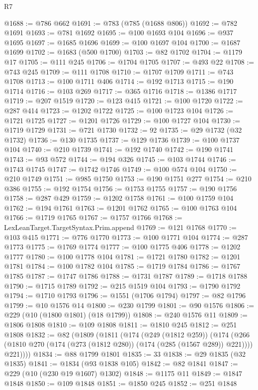 \begin{lexlean}{R7}
\begin{coremodule}
@1688 := @786 @662
@1691 := @783 (@785 (@1688 @806))
@1692 := @782 @1691
@1693 := @781 @1692
@1695 := @100 @1693 @104
@1696 := @937 @1695
@1697 := @1685 @1696
@1699 := @100 @1697 @104
@1700 := @1687 @1699
@1702 := @1683 (@500 @1700)
@1703 := @82 @1702
@1704 := @1179 @17
@1705 := @111 @245
@1706 := @1704 @1705
@1707 := @493 @22
@1708 := @743 @245
@1709 := @111 @1708
@1710 := @1707 @1709
@1711 := @743 @1708
@1713 := @100 @1711 @406
@1714 := @192 @1713
@1715 := @190 @1714
@1716 := @103 @269
@1717 := @365 @1716
@1718 := @1386 @1717
@1719 := @207 @1519
@1720 := @123 @415
@1721 := @100 @1720
@1722 := @287 @414
@1723 := @1202 @1722
@1725 := @100 @1723 @104
@1726 := @1721 @1725
@1727 := @1201 @1726
@1729 := @100 @1727 @104
@1730 := @1719 @1729
@1731 := @721 @1730
@1732 := 92
@1735 := @29 @1732 (@32 @1732)
@1736 := @130 @1735
@1737 := @129 @1736
@1739 := @100 @1737 @104
@1740 := @210 @1739
@1741 := @192 @1740
@1742 := @190 @1741
@1743 := @93 @572
@1744 := @194 @326
@1745 := @103 @1744
@1746 := @1743 @1745
@1747 := @1742 @1746
@1749 := @100 @574 @104
@1750 := @210 @1749
@1751 := @985 @1750
@1753 := @190 @1751 @277
@1754 := @210 @386
@1755 := @192 @1754
@1756 := @1753 @1755
@1757 := @190 @1756
@1758 := @287 @429
@1759 := @1202 @1758
@1761 := @100 @1759 @104
@1762 := @194 @1761
@1763 := @1201 @1762
@1765 := @100 @1763 @104
@1766 := @1719 @1765
@1767 := @1757 @1766
@1768 := LexLeanTarget.TargetSyntax.Prim.append
@1769 := @121 @1768
@1770 := @103 @415
@1771 := @776 @1770
@1773 := @100 @1771 @104
@1774 := @287 @1773
@1775 := @1769 @1774
@1777 := @100 @1775 @406
@1778 := @1202 @1777
@1780 := @100 @1778 @104
@1781 := @1721 @1780
@1782 := @1201 @1781
@1784 := @100 @1782 @104
@1785 := @1719 @1784
@1786 := @1767 @1785
@1787 := @1747 @1786
@1788 := @1731 @1787
@1789 := @1718 @1788
@1790 := @1715 @1789
@1792 := @215 @1519 @104
@1793 := @1790 @1792
@1794 := @1710 @1793
@1796 := @1551 (@1706 @1794)
@1797 := @82 @1796
@1799 := @10 @1576 @14
@1800 := @230 @1799
@1801 := @90 @1576
@1806 := @229 (@10 (@1800 @1801) (@18 @1799))
@1808 := @240 @1576 @11
@1809 := @1806 @1808
@1810 := @109 @1808
@1811 := @1810 @245
@1812 := @251 @1808
@1832 := @82
    (@1809
      (@1811
        (@174
          (@249 (@1812 @259))
          (@174
            (@266 (@1810 @270 (@174 (@273 (@1812 @280)) (@174 (@285 (@1567 @289)) @221))))
            @221))))
@1834 := @88 @1799 @1801
@1835 := 33
@1838 := @29 @1835 (@32 @1835)
@1841 := @1834 (@93 @1838 @105)
@1842 := @82 @1841
@1847 := @229 (@10 (@230 @19 @1607) @1302)
@1848 := @1175 @11
@1849 := @1847 @1848
@1850 := @109 @1848
@1851 := @1850 @245
@1852 := @251 @1848

\end{coremodule}
\end{lexlean}

